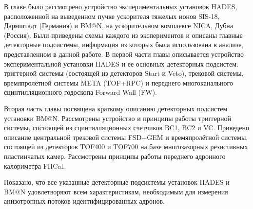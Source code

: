В главе было рассмотрено устройство экспериментальных устано­вок HADES, расположенной на выведенном пучке ускорителя тяжелых ионов SIS-18, Дармштадт (Германия) и BM@N, на ускорительном комплексе NICA, Дубна (Россия). 
Были  приведены схемы каждого из экспериментов и описаны главные детекторные подсистемы, информация из которых была ис­пользована в анализе, представленном в данной работе.
В первой части главы описывается устройство экспериментальной установки HADES и ее основных детекторных подсистем: 
триггерной системы (состоящей из детекторов Start и Veto), трековой системы, времяпролётной системы META (TOF+RPC) и переднего многоканального сцинтилляционного годоскопа Forward Wall (FW).

Вторая часть главы посвящена краткому описанию детекторных подсистем установки BM@N.
Рассмотрены устройство и принципы работы триггерной системы, состоящей из сцинтилляционных счетчиков BC1, BC2 и VC.
Приведено описание центральной трековой системы FSD+GEM и времяпролётной системы, состоящей из детекторов TOF400 и TOF700 на базе многозазорных резистивных пластинчатых камер.
Рассмотрены принципы работы переднего адронного калориметра FHCal.

Показано, что все указанные детекторные подсистемы установок HADES  и BM@N  удовлетворяют всем характеристикам, необходимым для измерения анизотропных
потоков идентифицированных адронов.